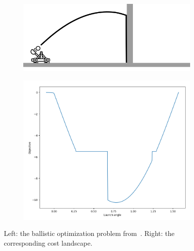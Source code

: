 {\begin{figure}[t]
    \centering
    \begin{subfigure}[t]{0.6\linewidth}
        \centering
        \includegraphics[width=\linewidth]{images/global_methods/ballistic.png}
    \end{subfigure}
    \begin{subfigure}[t]{0.3\linewidth}
        \centering
        \includegraphics[width=\linewidth]{images/global_methods/ballistic_cost.png}
    \end{subfigure}%
    \caption{Left: the ballistic optimization problem from~\cite{suhDifferentiableSimulatorsGive2022}. Right: the corresponding cost landscape.}
    \label{ch:corl:fig:ballistic}
\end{figure}

}
